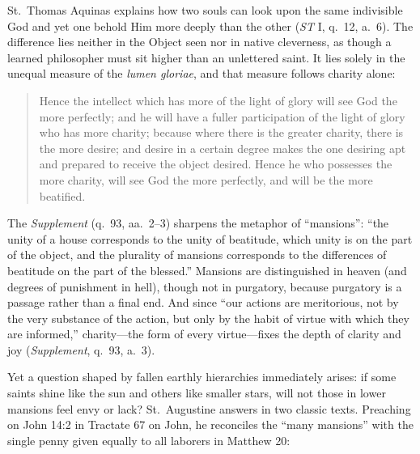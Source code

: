 St.\ Thomas Aquinas explains how two souls can look upon the same indivisible God and yet one behold Him more deeply than the other (\textit{ST} I, q.\ 12, a.\ 6). The difference lies neither in the Object seen nor in native cleverness, as though a learned philosopher must sit higher than an unlettered saint. It lies solely in the unequal measure of the \textit{lumen gloriae}, and that measure follows charity alone:

\begin{quote}
Hence the intellect which has more of the light of glory will see God the more perfectly; and he will have a fuller participation of the light of glory who has more charity; because where there is the greater charity, there is the more desire; and desire in a certain degree makes the one desiring apt and prepared to receive the object desired. Hence he who possesses the more charity, will see God the more perfectly, and will be the more beatified.
\end{quote}

The \textit{Supplement} (q.\ 93, aa.\ 2--3) sharpens the metaphor of ``mansions'': ``the unity of a house corresponds to the unity of beatitude, which unity is on the part of the object, and the plurality of mansions corresponds to the differences of beatitude on the part of the blessed.'' Mansions are distinguished in heaven (and degrees of punishment in hell), though not in purgatory, because purgatory is a passage rather than a final end. And since ``our actions are meritorious, not by the very substance of the action, but only by the habit of virtue with which they are informed,'' charity---the form of every virtue---fixes the depth of clarity and joy (\textit{Supplement}, q.\ 93, a.\ 3).

Yet a question shaped by fallen earthly hierarchies immediately arises: if some saints shine like the sun and others like smaller stars, will not those in lower mansions feel envy or lack? St.\ Augustine answers in two classic texts. Preaching on John 14:2 in Tractate 67 on John, he reconciles the ``many mansions'' with the single penny given equally to all laborers in Matthew 20:


